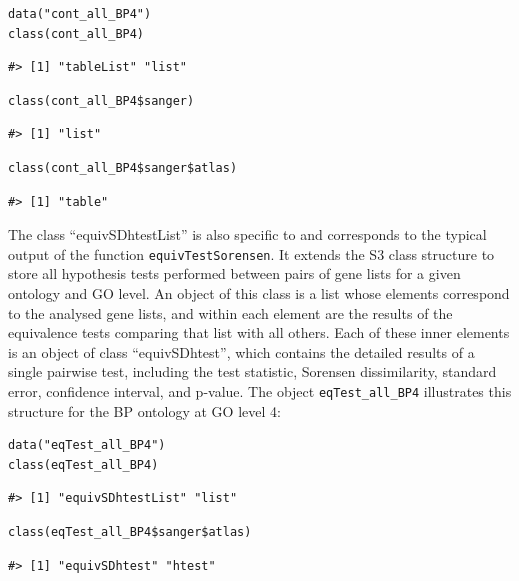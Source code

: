\begin{verbatim}
data("cont_all_BP4")
class(cont_all_BP4)
\end{verbatim}

\begin{verbatim}
#> [1] "tableList" "list"
\end{verbatim}

\begin{verbatim}
class(cont_all_BP4$sanger)
\end{verbatim}

\begin{verbatim}
#> [1] "list"
\end{verbatim}

\begin{verbatim}
class(cont_all_BP4$sanger$atlas)
\end{verbatim}

\begin{verbatim}
#> [1] "table"
\end{verbatim}

The class ``equivSDhtestList'' is also specific to  and corresponds to the typical output of the function \texttt{equivTestSorensen}. It extends the S3 class structure to store all hypothesis tests performed between pairs of gene lists for a given ontology and GO level. An object of this class is a list whose elements correspond to the analysed gene lists, and within each element are the results of the equivalence tests comparing that list with all others. Each of these inner elements is an object of class ``equivSDhtest'', which contains the detailed results of a single pairwise test, including the test statistic, Sorensen dissimilarity, standard error, confidence interval, and p-value. The object \texttt{eqTest\_all\_BP4} illustrates this structure for the BP ontology at GO level 4:

\begin{verbatim}
data("eqTest_all_BP4")
class(eqTest_all_BP4)
\end{verbatim}

\begin{verbatim}
#> [1] "equivSDhtestList" "list"
\end{verbatim}

\begin{verbatim}
class(eqTest_all_BP4$sanger$atlas)
\end{verbatim}

\begin{verbatim}
#> [1] "equivSDhtest" "htest"
\end{verbatim}

